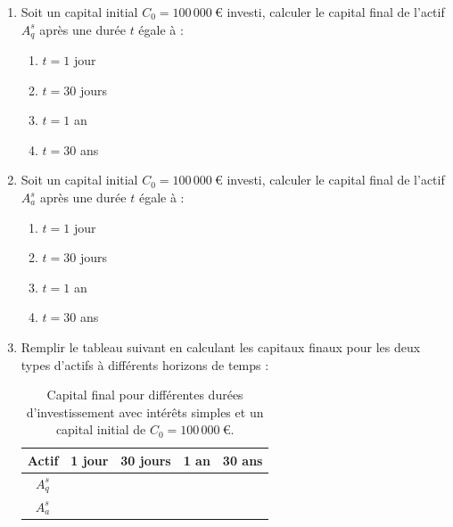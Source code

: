 \documentclass{article}
\begin{document}
\begin{enumerate}[label=\textbf{Q1.\arabic*}]
    \item Soit un capital initial \( C_0 = 100\,000\ \text{€} \) investi, calculer le capital final de l'actif \( A_q^s \) après une durée \( t \) égale à :
          \begin{enumerate}[label=(\alph*)]
              \item \( t = 1 \) jour
              \item \( t = 30 \) jours
              \item \( t = 1 \) an
              \item \( t = 30 \) ans
          \end{enumerate}
          
    \item Soit un capital initial \( C_0 = 100\,000\ \text{€} \) investi, calculer le capital final de l'actif \( A_a^s \) après une durée \( t \) égale à :
          \begin{enumerate}[label=(\alph*)]
              \item \( t = 1 \) jour
              \item \( t = 30 \) jours
              \item \( t = 1 \) an
              \item \( t = 30 \) ans
          \end{enumerate}
              
    \item Remplir le tableau suivant en calculant les capitaux finaux pour les deux types d'actifs à différents horizons de temps :\\
          \begin{table}[h!]
              \centering
              \begin{tabular}{|c|c|c|c|c|}
                  \hline
                  \textbf{Actif} & \textbf{1 jour} & \textbf{30 jours} & \textbf{1 an} & \textbf{30 ans} \\
                  \hline
                  \( A_q^s \)    &                 &                   &               &                 \\
                  \hline
                  \( A_a^s \)    &                 &                   &               &                 \\
                  \hline
              \end{tabular}
              \caption{Capital final pour différentes durées d'investissement avec intérêts simples et un capital initial de \( C_0 = 100\,000\ \text{€} \).}
              \label{tab:simple_interest_results}
          \end{table}
          

\end{enumerate}
\end{document}

